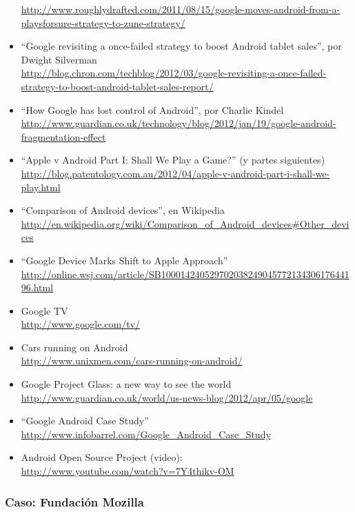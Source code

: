 \documentclass[a4paper,12pt]{article}
\begin{document}
\begin{itemize}
  \url{http://www.roughlydrafted.com/2011/08/15/google-moves-android-from-a-playsforsure-strategy-to-zune-strategy/}
\item ``Google revisiting a once-failed strategy to boost Android tablet sales'', por Dwight Silverman \\
  \url{http://blog.chron.com/techblog/2012/03/google-revisiting-a-once-failed-strategy-to-boost-android-tablet-sales-report/}
\item ``How Google has lost control of Android'', por Charlie Kindel \\
  \url{http://www.guardian.co.uk/technology/blog/2012/jan/19/google-android-fragmentation-effect}
\item ``Apple v Android Part I: Shall We Play a Game?'' (y partes siguientes) \\
  \url{http://blog.patentology.com.au/2012/04/apple-v-android-part-i-shall-we-play.html}
\item ``Comparison of Android devices'', en Wikipedia \\
  \url{http://en.wikipedia.org/wiki/Comparison_of_Android_devices#Other_devices}
\item ``Google Device Marks Shift to Apple Approach'' \\
  \url{http://online.wsj.com/article/SB10001424052970203824904577213430617644196.html}
\item Google TV \\
  \url{http://www.google.com/tv/}
\item Cars running on Android \\
  \url{http://www.unixmen.com/cars-running-on-android/}
\item Google Project Glass: a new way to see the world \\
  \url{http://www.guardian.co.uk/world/us-news-blog/2012/apr/05/google}
\item ``Google Android Case Study'' \\
  \url{http://www.infobarrel.com/Google_Android_Case_Study}
\item Android Open Source Project (video): \\
  \url{http://www.youtube.com/watch?v=7Y4thikv-OM}
\end{itemize}

\subsubsection{Caso: Fundación Mozilla}
\label{sub:case-mozilla}
\end{document}
